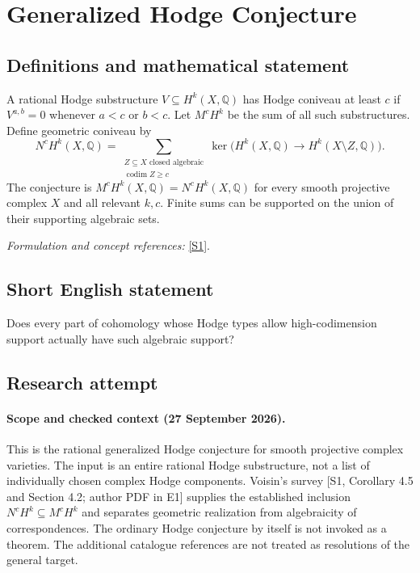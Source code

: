 \documentclass[11pt]{article}
\begin{document}
\section*{\texorpdfstring{Generalized Hodge Conjecture}{Generalized Hodge Conjecture}}\label{30000968}
\subsection{Definitions and mathematical statement}
A rational Hodge substructure $V\subseteq H^k(X,{\mathbb{Q}})$ has Hodge coniveau at least $c$ if $V^{a,b}=0$ whenever $a<c$ or $b<c$. Let $M^cH^k$ be the sum of all such substructures. Define geometric coniveau by
\[
 N^cH^k(X,{\mathbb{Q}})=\sum_{\substack{Z\subseteq X\text{ closed algebraic}\\ \operatorname{codim}Z\ge c}}
 \ker\bigl(H^k(X,{\mathbb{Q}})\to H^k(X\setminus Z,{\mathbb{Q}})\bigr).
\]
The conjecture is $M^cH^k(X,{\mathbb{Q}})=N^cH^k(X,{\mathbb{Q}})$ for every smooth projective complex $X$ and all relevant $k,c$. Finite sums can be supported on the union of their supporting algebraic sets.
\par\smallskip\textit{Formulation and concept references:} \href{https://jomprob.org/index.php/jomp/article/view/Vol-1Issue-1Paper-2}{[S1]}.

\subsection{Short English statement}
Does every part of cohomology whose Hodge types allow high-codimension support actually have such algebraic support?
\subsection{Research attempt}

\paragraph{Scope and checked context (27 September 2026).}
This is the rational generalized Hodge conjecture for smooth projective
 complex varieties. The input is an entire rational Hodge substructure,
 not a list of individually chosen complex Hodge components. Voisin's
 survey [S1, Corollary 4.5 and Section 4.2; author PDF in E1] supplies the
 established inclusion $N^cH^k\subseteq M^cH^k$ and separates geometric
 realization from algebraicity of correspondences. The ordinary Hodge
 conjecture by itself is not invoked as a theorem. The additional
 catalogue references are not treated as resolutions of the general target.
\end{document}
